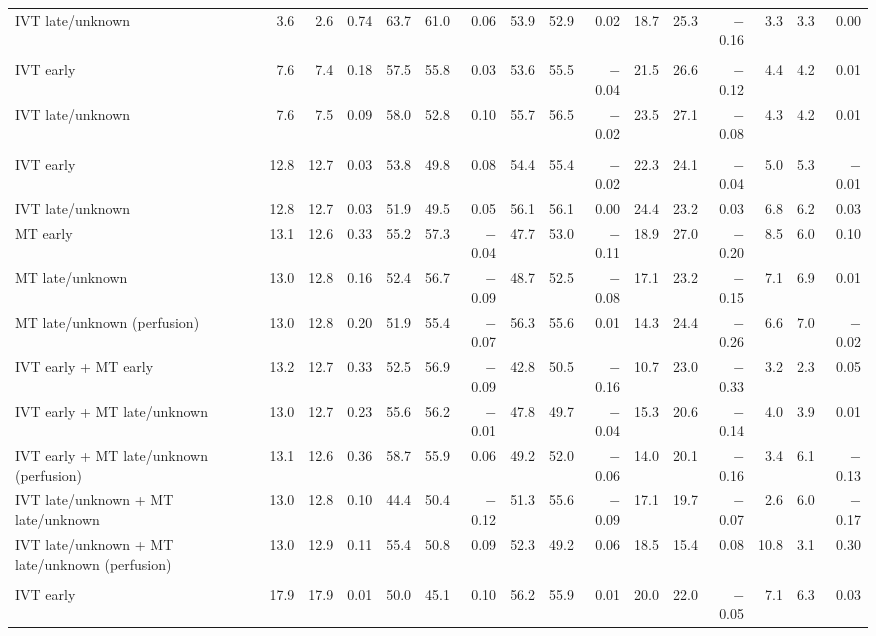 \begin{landscape}
\begin{longtable}{p{5.6cm}rrrrrrrrrrrrrrr}
IVT late/unknown & 3.6 & 2.6 & 0.74 & 63.7 & 61.0 & 0.06 & 53.9 & 52.9 & 0.02 & 18.7 & 25.3 & $-$0.16 & 3.3 & 3.3 & 0.00 \\
\addlinespace
\multicolumn{16}{l}{\textbf{NIHSS 6--10}}\\
IVT early & 7.6 & 7.4 & 0.18 & 57.5 & 55.8 & 0.03 & 53.6 & 55.5 & $-$0.04 & 21.5 & 26.6 & $-$0.12 & 4.4 & 4.2 & 0.01 \\
IVT late/unknown & 7.6 & 7.5 & 0.09 & 58.0 & 52.8 & 0.10 & 55.7 & 56.5 & $-$0.02 & 23.5 & 27.1 & $-$0.08 & 4.3 & 4.2 & 0.01 \\
\addlinespace
\multicolumn{16}{l}{\textbf{NIHSS 11--15}}\\
IVT early & 12.8 & 12.7 & 0.03 & 53.8 & 49.8 & 0.08 & 54.4 & 55.4 & $-$0.02 & 22.3 & 24.1 & $-$0.04 & 5.0 & 5.3 & $-$0.01 \\
IVT late/unknown & 12.8 & 12.7 & 0.03 & 51.9 & 49.5 & 0.05 & 56.1 & 56.1 & 0.00 & 24.4 & 23.2 & 0.03 & 6.8 & 6.2 & 0.03 \\
MT early & 13.1 & 12.6 & 0.33 & 55.2 & 57.3 & $-$0.04 & 47.7 & 53.0 & $-$0.11 & 18.9 & 27.0 & $-$0.20 & 8.5 & 6.0 & 0.10 \\
MT late/unknown & 13.0 & 12.8 & 0.16 & 52.4 & 56.7 & $-$0.09 & 48.7 & 52.5 & $-$0.08 & 17.1 & 23.2 & $-$0.15 & 7.1 & 6.9 & 0.01 \\
MT late/unknown (perfusion) & 13.0 & 12.8 & 0.20 & 51.9 & 55.4 & $-$0.07 & 56.3 & 55.6 & 0.01 & 14.3 & 24.4 & $-$0.26 & 6.6 & 7.0 & $-$0.02 \\
IVT early + MT early & 13.2 & 12.7 & 0.33 & 52.5 & 56.9 & $-$0.09 & 42.8 & 50.5 & $-$0.16 & 10.7 & 23.0 & $-$0.33 & 3.2 & 2.3 & 0.05 \\
IVT early + MT late/unknown & 13.0 & 12.7 & 0.23 & 55.6 & 56.2 & $-$0.01 & 47.8 & 49.7 & $-$0.04 & 15.3 & 20.6 & $-$0.14 & 4.0 & 3.9 & 0.01 \\
IVT early + MT late/unknown (perfusion) & 13.1 & 12.6 & 0.36 & 58.7 & 55.9 & 0.06 & 49.2 & 52.0 & $-$0.06 & 14.0 & 20.1 & $-$0.16 & 3.4 & 6.1 & $-$0.13 \\
IVT late/unknown + MT late/unknown & 13.0 & 12.8 & 0.10 & 44.4 & 50.4 & $-$0.12 & 51.3 & 55.6 & $-$0.09 & 17.1 & 19.7 & $-$0.07 & 2.6 & 6.0 & $-$0.17 \\
IVT late/unknown + MT late/unknown (perfusion) & 13.0 & 12.9 & 0.11 & 55.4 & 50.8 & 0.09 & 52.3 & 49.2 & 0.06 & 18.5 & 15.4 & 0.08 & 10.8 & 3.1 & 0.30 \\
\addlinespace
\multicolumn{16}{l}{\textbf{NIHSS 16--20}}\\
IVT early & 17.9 & 17.9 & 0.01 & 50.0 & 45.1 & 0.10 & 56.2 & 55.9 & 0.01 & 20.0 & 22.0 & $-$0.05 & 7.1 & 6.3 & 0.03 \\

\end{longtable}
\end{landscape}
